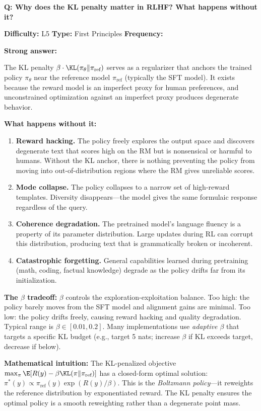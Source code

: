 \begin{interviewq}
\textbf{Q: Why does the KL penalty matter in RLHF? What happens without it?}

\textbf{Difficulty:} L5 \quad \textbf{Type:} First Principles \quad \textbf{Frequency:} \freqhigh{}

\textbf{Strong answer:}

The KL penalty $\beta \cdot \KL(\pi_\theta \| \pi_{\text{ref}})$ serves as a regularizer that anchors the trained policy $\pi_\theta$ near the reference model $\pi_{\text{ref}}$ (typically the SFT model). It exists because the reward model is an imperfect proxy for human preferences, and unconstrained optimization against an imperfect proxy produces degenerate behavior.

\textbf{What happens without it:}
\begin{enumerate}
    \item \textbf{Reward hacking.} The policy freely explores the output space and discovers degenerate text that scores high on the RM but is nonsensical or harmful to humans. Without the KL anchor, there is nothing preventing the policy from moving into out-of-distribution regions where the RM gives unreliable scores.
    \item \textbf{Mode collapse.} The policy collapses to a narrow set of high-reward templates. Diversity disappears---the model gives the same formulaic response regardless of the query.
    \item \textbf{Coherence degradation.} The pretrained model's language fluency is a property of its parameter distribution. Large updates during RL can corrupt this distribution, producing text that is grammatically broken or incoherent.
    \item \textbf{Catastrophic forgetting.} General capabilities learned during pretraining (math, coding, factual knowledge) degrade as the policy drifts far from its initialization.
\end{enumerate}

\textbf{The $\beta$ tradeoff:} $\beta$ controls the exploration-exploitation balance. Too high: the policy barely moves from the SFT model and alignment gains are minimal. Too low: the policy drifts freely, causing reward hacking and quality degradation. Typical range is $\beta \in [0.01, 0.2]$. Many implementations use \textit{adaptive $\beta$} that targets a specific KL budget (e.g., target 5 nats; increase $\beta$ if KL exceeds target, decrease if below).

\textbf{Mathematical intuition:} The KL-penalized objective $\max_\pi \E[R(y) - \beta \KL(\pi \| \pi_{\text{ref}})]$ has a closed-form optimal solution: $\pi^*(y) \propto \pi_{\text{ref}}(y) \exp(R(y)/\beta)$. This is the \textit{Boltzmann policy}---it reweights the reference distribution by exponentiated reward. The KL penalty ensures the optimal policy is a smooth reweighting rather than a degenerate point mass.


\end{interviewq}
